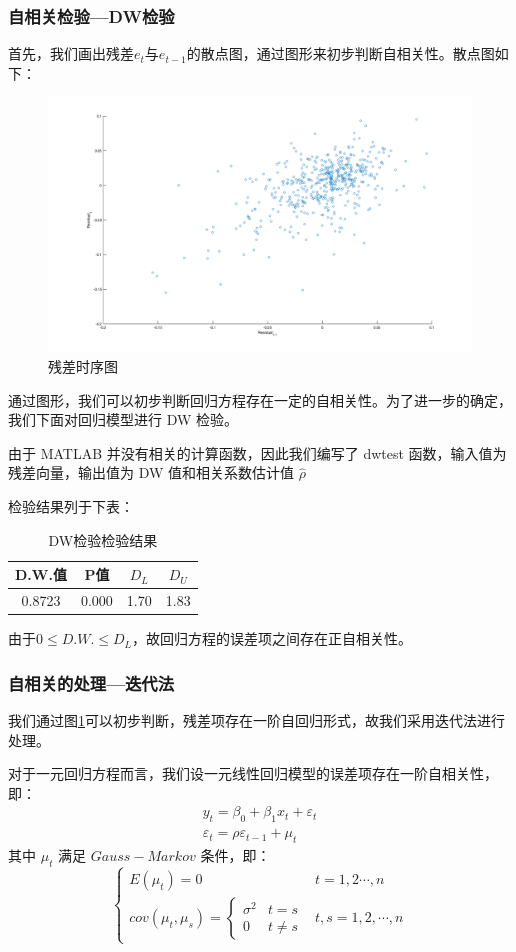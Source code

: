 \documentclass[11pt]{article}
\begin{document}
\subsubsection*{自相关检验---DW检验}
首先，我们画出残差$e_t$与$e_{t-1}$的散点图，通过图形来初步判断自相关性。散点图如下：
\begin{figure}[H]
	\centering
	\caption{残差时序图}
	\label{gra.15}
	\includegraphics[scale=0.3]{images/residuals_sequence.png}
\end{figure}
通过图形，我们可以初步判断回归方程存在一定的自相关性。为了进一步的确定，我们下面对回归模型进行 DW 检验。

由于 MATLAB 并没有相关的计算函数，因此我们编写了 dwtest 函数，输入值为残差向量，输出值为 DW 值和相关系数估计值 $\hat{\rho}$

检验结果列于下表：
\begin{table}[H]
	\centering
	\caption{DW检验检验结果}
	\begin{tabular}{cccc}
		\hline
		D.W.值&P值&$D_L$&$D_U$\\
		\hline
		0.8723&0.000&1.70&1.83\\
		\hline
	\end{tabular}
\end{table}
由于$0\le D.W.\le D_L$，故回归方程的误差项之间存在正自相关性。
\subsubsection*{自相关的处理---迭代法}
我们通过图\ref{gra.15}可以初步判断，残差项存在一阶自回归形式，故我们采用迭代法进行处理。

对于一元回归方程而言，我们设一元线性回归模型的误差项存在一阶自相关性，即：
$$
\begin{array}{c}
y_t=\beta_0+\beta_1x_t+\varepsilon_t\\
\varepsilon_t=\rho\varepsilon_{t-1}+\mu_t
\end{array}
$$
其中 $\mu_t$ 满足 $Gauss-Markov$ 条件，即：
$$
\left\{\begin{array}{ll}
    E(\mu_t)=0 & t=1,2\cdots,n \\
     cov(\mu_t,\mu_s)=\left\{\begin{array}{ll}
         \sigma^2 & t=s \\
          0&t\ne s 
     \end{array}\right.& t,s=1,2,\cdots,n
\end{array}\right.
$$
\end{document}
